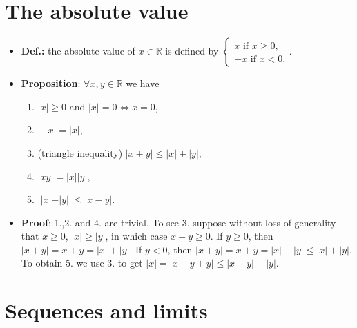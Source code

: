 \documentclass{article}
\begin{document}
\section{The absolute value}
\begin{itemize}
\item \textbf{Def.:} the absolute value of $x \in \mathbb{R}$ is defined by 
$\begin{cases}
x \text{ if } x \geq 0,\\
-x \text{ if } x < 0.
\end{cases}.$
\item \textbf{Proposition}: $\forall x, y \in \mathbb{R}$ we have 
\begin{enumerate}
    \item $|x| \geq 0$ and $|x| = 0 \iff x = 0$,
    \item $|-x| = |x|$,
    \item (triangle inequality) $|x + y| \leq |x| + |y|$,
    \item $|xy| = |x||y|$,
    \item $||x| - |y|| \leq |x - y|$.
\end{enumerate}

\item \textbf{Proof}: 1.,2. and 4. are trivial. To see 3. suppose without loss of generality that $x \geq 0$, $|x| \geq |y|$, in which case $x + y \geq 0$. If $y \geq 0$, then $|x + y| = x + y = |x| + |y|$. If $y < 0$, then $|x + y| = x + y = |x| - |y| \leq |x| + |y|$. To obtain 5. we use 3. to get $|x| = |x - y + y| \leq |x - y| + |y|$.
\end{itemize}

\section{Sequences and limits}
\end{document}
